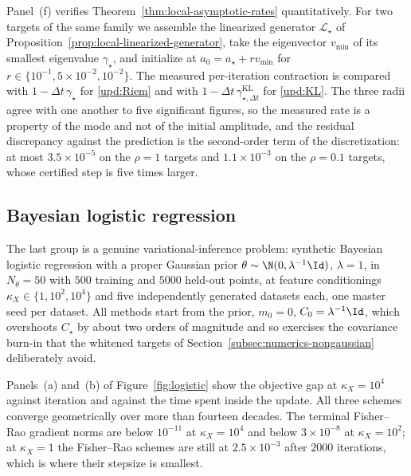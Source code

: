 Panel~(f) verifies Theorem~\ref{thm:local-asymptotic-rates} quantitatively. For
two targets of the same family we assemble the linearized generator
$\mathcal L_\star$ of Proposition~\ref{prop:local-linearized-generator}, take the
eigenvector $v_{\min}$ of its smallest eigenvalue $\gamma_\star$, and initialize
at $a_0=a_\star+rv_{\min}$ for $r\in\{10^{-1},5\times10^{-2},10^{-2}\}$. The
measured per-iteration contraction is compared with $1-\Delta t\,\gamma_\star$ for
\eqref{upd:Riem} and with $1-\Delta t\,\gamma^{\mathrm{KL}}_{\star,\Delta t}$ for
\eqref{upd:KL}. The three radii agree with one another to five significant
figures, so the measured rate is a property of the mode and not of the initial
amplitude, and the residual discrepancy against the prediction is the
second-order term of the discretization: at most $3.5\times10^{-5}$ on the
$\rho=1$ targets and $1.1\times10^{-3}$ on the $\rho=0.1$ targets, whose certified
step is five times larger.

\subsection{Bayesian logistic regression}
\label{subsec:numerics-logistic}

The last group is a genuine variational-inference problem: synthetic Bayesian
logistic regression with a proper Gaussian prior
$\theta\sim\N(0,\lambda^{-1}\Id)$, $\lambda=1$, in $N_\theta=50$ with $500$
training and $5000$ held-out points, at feature conditionings
$\kappa_X\in\{1,10^2,10^4\}$ and five independently generated datasets each, one
master seed per dataset. All methods start from the prior, $m_0=0$,
$C_0=\lambda^{-1}\Id$, which overshoots $C_\star$ by about two orders of magnitude
and so exercises the covariance burn-in that the whitened targets of
Section~\ref{subsec:numerics-nongaussian} deliberately avoid.

Panels~(a) and~(b) of Figure~\ref{fig:logistic} show the objective gap at
$\kappa_X=10^4$ against iteration and against the time spent inside the update.
All three schemes converge geometrically over more than fourteen decades. The
terminal Fisher--Rao gradient norms are below $10^{-11}$ at $\kappa_X=10^4$ and
below $3\times10^{-8}$ at $\kappa_X=10^2$; at $\kappa_X=1$ the Fisher--Rao schemes
are still at $2.5\times10^{-3}$ after $2000$ iterations, which is where their
stepsize is smallest.

